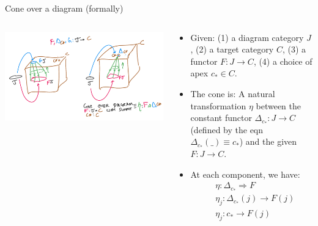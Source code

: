\documentclass[8pt]{beamer}
\newcommand{\nt}{\Rightarrow}
\begin{document}
\begin{frame}[fragile]{Cone over a diagram (formally)}
    \begin{columns}[T] %
        \begin{column}{.48\textwidth}
            \includegraphics[width=\textwidth]{./cone.png}
        \end{column}

    \begin{column}{.48\textwidth}
    \begin{itemize}
        \item Given: (1) a diagram category $J$, (2) a target category $C$, (3) a functor $F: J \to C$, (4)
              a choice of apex $c_* \in C$. \pause
        \item The cone is: A natural transformation $\eta$ between the constant functor $\Delta_{c_*}: J \to C$ 
            (defined by the eqn $\Delta_{c_*}(\_) \equiv c_*$) and the given $F: J \to C$. \pause
        \item At each component, we have:
            \begin{align*}
                &\eta: \Delta_{c_*} \nt F \\
                &\eta_j: \Delta_{c_*}(j) \to F(j) \\
                &\eta_j: c_* \to F(j) \\
            \end{align*}
    \end{itemize}
    \end{column}
    \end{columns}
\end{frame}
\end{document}
